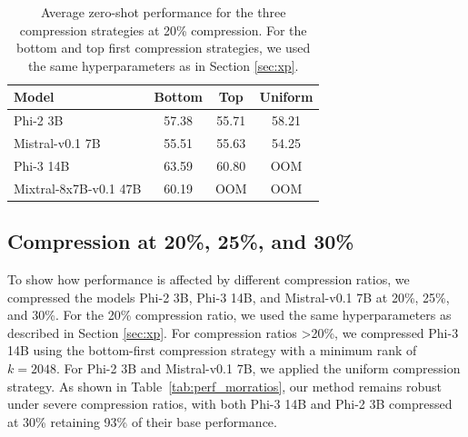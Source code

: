 \documentclass[11pt]{article}
\begin{document}
\begin{table}[!ht]
    {\small{
    \begin{tabular}{lccc}
    \toprule
    \textbf{Model }& \textbf{Bottom} & \textbf{Top} & \textbf{Uniform} \\ 
    \midrule
    Phi-2 3B & 57.38  & 55.71  & 58.21  \\ 
    Mistral-v0.1 7B & 55.51  & 55.63 & 54.25  \\ 
    Phi-3 14B & 63.59 & 60.80  & OOM  \\ 
    Mixtral-8x7B-v0.1 47B & 60.19 & OOM  & OOM  \\ 
    \bottomrule
    \end{tabular}
    }}
    \caption{Average zero-shot performance for the three compression strategies at 20\% compression. For the bottom and top first compression strategies, we used the same hyperparameters as in Section \ref{sec:xp}.}
\label{tab:cacc}
\end{table}


\subsection{Compression at 20\%, 25\%, and 30\%}
\label{ssec:severe}
To show how performance is affected by different compression ratios, we compressed the models Phi-2 3B, Phi-3 14B, and Mistral-v0.1 7B at 20\%, 25\%, and 30\%. For the 20\% compression ratio, we used the same hyperparameters as described in Section \ref{sec:xp}. For compression ratios >20\%, we compressed Phi-3 14B using the bottom-first compression strategy with a minimum rank of $k=2048$. For Phi-2 3B and Mistral-v0.1 7B, we applied the uniform compression strategy. As shown in Table~\ref{tab:perf_morratios}, our method remains robust under severe compression ratios, with both Phi-3 14B and Phi-2 3B compressed at 30\% retaining 93\% of their base performance.
\end{document}
